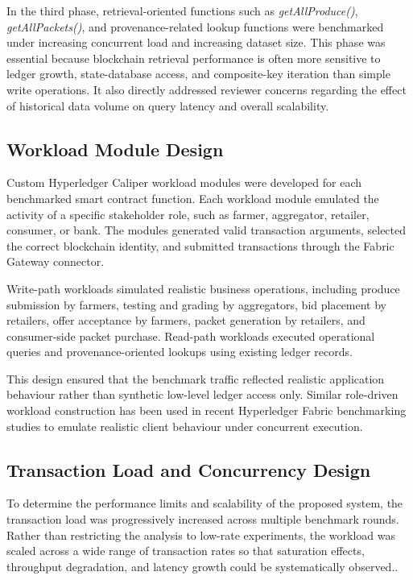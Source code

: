\documentclass[12pt]{article}
\begin{document}
	In the third phase, retrieval-oriented functions such as \textit{getAllProduce()}, \textit{getAllPackets()}, and provenance-related lookup functions were benchmarked under increasing concurrent load and increasing dataset size. This phase was essential because blockchain retrieval performance is often more sensitive to ledger growth, state-database access, and composite-key iteration than simple write operations. It also directly addressed reviewer concerns regarding the effect of historical data volume on query latency and overall scalability.
	
	\subsection{Workload Module Design}
	
	Custom Hyperledger Caliper workload modules were developed for each benchmarked smart contract function. Each workload module emulated the activity of a specific stakeholder role, such as farmer, aggregator, retailer, consumer, or bank. The modules generated valid transaction arguments, selected the correct blockchain identity, and submitted transactions through the Fabric Gateway connector.
	
	Write-path workloads simulated realistic business operations, including produce submission by farmers, testing and grading by aggregators, bid placement by retailers, offer acceptance by farmers, packet generation by retailers, and consumer-side packet purchase. Read-path workloads executed operational queries and provenance-oriented lookups using existing ledger records.
	
	This design ensured that the benchmark traffic reflected realistic application behaviour rather than synthetic low-level ledger access only. Similar role-driven workload construction has been used in recent Hyperledger Fabric benchmarking studies to emulate realistic client behaviour under concurrent execution. 
	
	\subsection{Transaction Load and Concurrency Design}
	
To determine the performance limits and scalability of the proposed system, the transaction load was progressively increased across multiple benchmark rounds. Rather than restricting the analysis to low-rate experiments, the workload was scaled across a wide range of transaction rates so that saturation effects, throughput degradation, and latency growth could be systematically observed..
	
\end{document}
